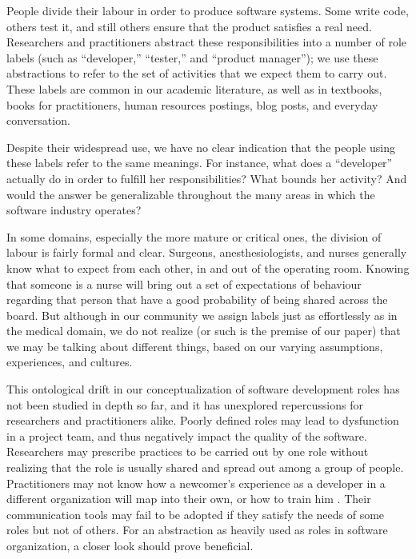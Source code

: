 \documentclass[10pt, conference, compsocconf]{IEEEtran}
\begin{document}
People divide their labour in order to produce software systems. Some write code, others test it, and still others ensure that the product satisfies a real need. Researchers and practitioners abstract these responsibilities into a number of role labels (such as ``developer,'' ``tester,'' and ``product manager''); we use these abstractions to refer to the set of activities that we expect them to carry out. These labels are common in our academic literature, as well as in textbooks, books for practitioners, human resources postings, blog posts, and everyday conversation.

Despite their widespread use, we have no clear indication that the people using these labels refer to the same meanings. For instance, what does a ``developer'' actually do in order to fulfill her responsibilities? What bounds her activity? And would the answer be generalizable throughout the many areas in which the software industry operates?

In some domains, especially the more mature or critical ones, the division of labour is fairly formal and clear. Surgeons, anesthesiologists, and nurses generally know what to expect from each other, in and out of the operating room. Knowing that someone is a nurse will bring out a set of expectations of behaviour regarding that person that have a good probability of being shared across the board. But although in our community we assign labels just as effortlessly as in the medical domain, we do not realize (or such is the premise of our paper) that we may be talking about different things, based on our varying assumptions, experiences, and cultures.

This ontological drift \cite{Robinson1991} in our conceptualization of software development roles has not been studied in depth so far, and it has unexplored repercussions for researchers and practitioners alike. Poorly defined roles may lead to dysfunction in a project team, and thus negatively impact the quality of the software. Researchers may prescribe practices to be carried out by one role without realizing that the role is usually shared and spread out among a group of people. Practitioners may not know how a newcomer's experience as a developer in a different organization will map into their own, or how to train him \cite{Dagenais2010}. Their communication tools may fail to be adopted if they satisfy the needs of some roles but not of others. For an abstraction as heavily used as roles in software organization, a closer look should prove beneficial.
\end{document}
